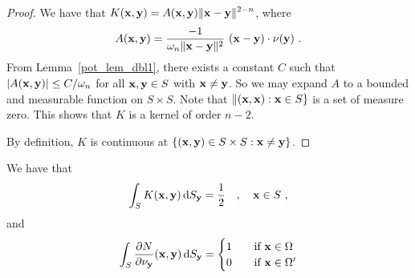 \begin{proof}
We have that $\displaystyle K(\mathbf{x},\mathbf{y}) = A(\mathbf{x},\mathbf{y})
\|\mathbf{x}- \mathbf{y}\|^{2-n}$, where
\[
A(\mathbf{x},\mathbf{y}) = \frac{-1}{\omega_n \|\mathbf{x}-\mathbf{y}\|^2}\,
\left(\mathbf{x}-\mathbf{y}\right)\cdot \mathbf{\nu}(\mathbf{y}) \  .
\]
From Lemma~\ref{pot_lem_dbl1}, there exists a constant $C$ such that
$\displaystyle \left| A(\mathbf{x},\mathbf{y})\right| \leq C/\omega_n$ for
all $\mathbf{x},\mathbf{y} \in S$ with $\mathbf{x} \neq \mathbf{y}$.
So we may expand $A$ to a bounded and measurable function
on $S \times S$.  Note that $\|(\mathbf{x},\mathbf{x}) : \mathbf{x} \in S\}$
is a set of measure zero.  This shows that $K$ is a kernel of order
$n-2$.

By definition, $K$ is continuous at
$\{ (\mathbf{x},\mathbf{y}) \in S \times S : \mathbf{x} \neq \mathbf{y}\}$.
\end{proof}

\begin{lemma} \label{pot_lem_dbl3}
We have that
\begin{equation} \label{pot_lem_dbl3E1}
\int_S K(\mathbf{x},\mathbf{y}) \,\mathrm{d}{S}_{\mathbf{y}} = \frac{1}{2} \quad , \quad
\mathbf{x} \in S \ ,
\end{equation}
and
\begin{equation} \label{pot_lem_dbl3E2}
\int_S \frac{\partial{N}}{\partial \mathbf{\nu}_{\mathbf{y}}}(\mathbf{x},\mathbf{y}) \,\mathrm{d}{S}_{\mathbf{y}} =
\begin{cases}
1 & \quad \text{if} \ \mathbf{x} \in \Omega \\
0 & \quad \text{if} \ \mathbf{x} \in \Omega^{\prime}
\end{cases}
\end{equation}
\end{lemma}

